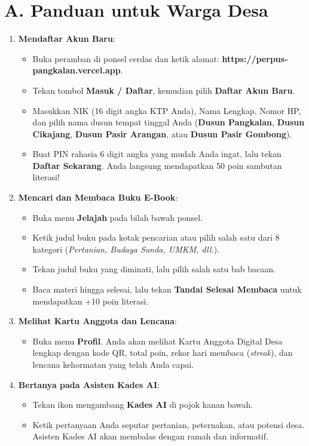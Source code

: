 \documentclass[
  indonesian,
  12pt,
]{report}
\providecommand{\tightlist}{%
  \setlength{\itemsep}{0pt}\setlength{\parskip}{0pt}}
\begin{document}
\section{A. Panduan untuk Warga Desa}\label{a.-panduan-untuk-warga-desa}

\begin{enumerate}
\def\labelenumi{\arabic{enumi}.}
\tightlist
\item
  \textbf{Mendaftar Akun Baru}:

  \begin{itemize}
  \tightlist
  \item
    Buka peramban di ponsel cerdas dan ketik alamat:
    \textbf{https://perpus-pangkalan.vercel.app}.
  \item
    Tekan tombol \textbf{Masuk / Daftar}, kemudian pilih \textbf{Daftar
    Akun Baru}.
  \item
    Masukkan NIK (16 digit angka KTP Anda), Nama Lengkap, Nomor HP, dan
    pilih nama dusun tempat tinggal Anda (\textbf{Dusun Pangkalan},
    \textbf{Dusun Cikajang}, \textbf{Dusun Pasir Arangan}, atau
    \textbf{Dusun Pasir Gombong}).
  \item
    Buat PIN rahasia 6 digit angka yang mudah Anda ingat, lalu tekan
    \textbf{Daftar Sekarang}. Anda langsung mendapatkan 50 poin sambutan
    literasi!
  \end{itemize}
\item
  \textbf{Mencari dan Membaca Buku E-Book}:

  \begin{itemize}
  \tightlist
  \item
    Buka menu \textbf{Jelajah} pada bilah bawah ponsel.
  \item
    Ketik judul buku pada kotak pencarian atau pilih salah satu dari 8
    kategori (\emph{Pertanian, Budaya Sunda, UMKM, dll.}).
  \item
    Tekan judul buku yang diminati, lalu pilih salah satu bab bacaan.
  \item
    Baca materi hingga selesai, lalu tekan \textbf{Tandai Selesai
    Membaca} untuk mendapatkan +10 poin literasi.
  \end{itemize}
\item
  \textbf{Melihat Kartu Anggota dan Lencana}:

  \begin{itemize}
  \tightlist
  \item
    Buka menu \textbf{Profil}. Anda akan melihat Kartu Anggota Digital
    Desa lengkap dengan kode QR, total poin, rekor hari membaca
    (\emph{streak}), dan lencana kehormatan yang telah Anda capai.
  \end{itemize}
\item
  \textbf{Bertanya pada Asisten Kades AI}:

  \begin{itemize}
  \tightlist
  \item
    Tekan ikon mengambang \textbf{Kades AI} di pojok kanan bawah.
  \item
    Ketik pertanyaan Anda seputar pertanian, peternakan, atau potensi
    desa. Asisten Kades AI akan membalas dengan ramah dan informatif.
  \end{itemize}
\end{enumerate}
\end{document}

